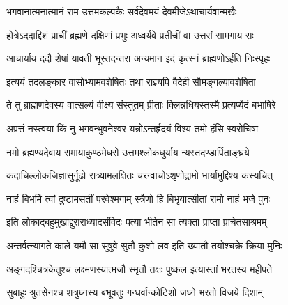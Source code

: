 

\storymeta


\twolineshloka
{भगवानात्मनात्मानं राम उत्तमकल्पकैः}
{सर्वदेवमयं देवमीजेऽथाचार्यवान्मखैः} %

\twolineshloka
{होत्रेऽददाद्दिशं प्राचीं ब्रह्मणे दक्षिणां प्रभुः}
{अध्वर्यवे प्रतीचीं वा उत्तरां सामगाय सः} %

\twolineshloka
{आचार्याय ददौ शेषां यावती भूस्तदन्तरा}
{अन्यमान इदं कृत्स्नं ब्राह्मणोऽर्हति निःस्पृहः} %

\twolineshloka
{इत्ययं तदलङ्कार वासोभ्यामवशेषितः}
{तथा राज्ञ्यपि वैदेही सौमङ्गल्यावशेषिता} %

\twolineshloka
{ते तु ब्राह्मणदेवस्य वात्सल्यं वीक्ष्य संस्तुतम्}
{प्रीताः क्लिन्नधियस्तस्मै प्रत्यर्प्येदं बभाषिरे} %

\twolineshloka
{अप्रत्तं नस्त्वया किं नु भगवन्भुवनेश्वर}
{यन्नोऽन्तर्हृदयं विश्य तमो हंसि स्वरोचिषा} %

\twolineshloka
{नमो ब्रह्मण्यदेवाय रामायाकुण्ठमेधसे}
{उत्तमश्लोकधुर्याय न्यस्तदण्डार्पिताङ्घ्रये} %

\twolineshloka
{कदाचिल्लोकजिज्ञासुर्गूढो रात्र्यामलक्षितः}
{चरन्वाचोऽशृणोद्रामो भार्यामुद्दिश्य कस्यचित्} %

\twolineshloka
{नाहं बिभर्मि त्वां दुष्टामसतीं परवेश्मगाम्}
{स्त्रैणो हि बिभृयात्सीतां रामो नाहं भजे पुनः} %

\twolineshloka
{इति लोकाद्बहुमुखाद्दुराराध्यादसंविदः}
{पत्या भीतेन सा त्यक्ता प्राप्ता प्राचेतसाश्रमम्} %

\twolineshloka
{अन्तर्वत्न्यागते काले यमौ सा सुषुवे सुतौ}
{कुशो लव इति ख्यातौ तयोश्चक्रे क्रिया मुनिः} %

\twolineshloka
{अङ्गदश्चित्रकेतुश्च लक्ष्मणस्यात्मजौ स्मृतौ}
{तक्षः पुष्कल इत्यास्तां भरतस्य महीपते} %

\twolineshloka
{सुबाहुः श्रुतसेनश्च शत्रुघ्नस्य बभूवतुः}
{गन्धर्वान्कोटिशो जघ्ने भरतो विजये दिशाम्} %

